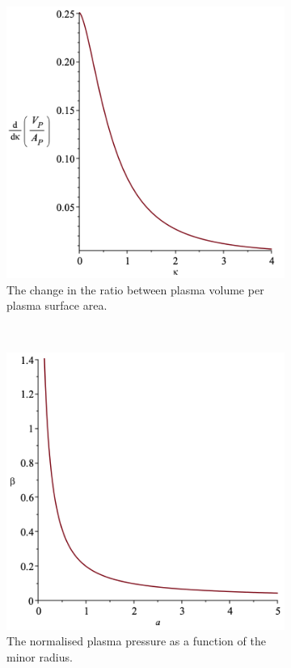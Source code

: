 \begin{figure}
	\centering
	\begin{subfigure}[b]{.40\textwidth}
		\includegraphics[width=\textwidth]{Figures/kappa_change.png}
		\caption{The change in the ratio between plasma volume per plasma surface area.}
		\label{kappa_change}
	\end{subfigure}
	~
	\begin{subfigure}[b]{.40\textwidth}
		\includegraphics[width=\textwidth]{Figures/beta_vs_a.png}
		\caption{The normalised plasma pressure as a function of the minor radius.\vspace{\baselineskip}}
		\label{beta_vs_a}
	\end{subfigure}
	\caption{}
	\label{A_kappa}
\end{figure}
